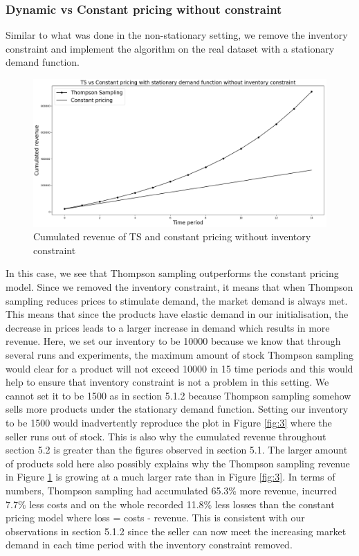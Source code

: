 \documentclass[a4paper]{article}
\begin{document}
\subsubsection{Dynamic vs Constant pricing without constraint}
Similar to what was done in the non-stationary setting, we remove the inventory constraint and implement the algorithm on the real dataset with a stationary demand function.
\begin{figure}[h]
	\centering
	\includegraphics[width=1.03\textwidth]{522.png}
	\caption{\label{fig:1}Cumulated revenue of TS and constant pricing without inventory constraint}
\end{figure}
\newline
In this case, we see that Thompson sampling outperforms the constant pricing model. Since we removed the inventory constraint, it means that when Thompson sampling reduces prices to stimulate demand, the market demand is always met. This means that since the products have elastic demand in our initialisation, the decrease in prices leads to a larger increase in demand which results in more revenue.
\newline
\newline
Here, we set our inventory to be 10000 because we know that through several runs and experiments, the maximum amount of stock Thompson sampling would clear for a product will not exceed 10000 in 15 time periods and this would help to ensure that inventory constraint is not a problem in this setting. We cannot set it to be 1500 as in section 5.1.2 because Thompson sampling somehow sells more products under the stationary demand function. Setting our inventory to be 1500 would inadvertently reproduce the plot in Figure \ref{fig:3} where the seller runs out of stock. This is also why the cumulated revenue throughout section 5.2 is greater than the figures observed in section 5.1. The larger amount of products sold here also possibly explains why the Thompson sampling revenue in Figure \ref{fig:1} is growing at a much larger rate than in Figure \ref{fig:3}.
\newline
\newline
In terms of numbers, Thompson sampling had accumulated 65.3\% more revenue, incurred 7.7\% less costs and on the whole recorded 11.8\% less losses than the constant pricing model where loss = costs - revenue. This is consistent with our observations in section 5.1.2 since the seller can now meet the increasing market demand in each time period with the inventory constraint removed.
\end{document}
